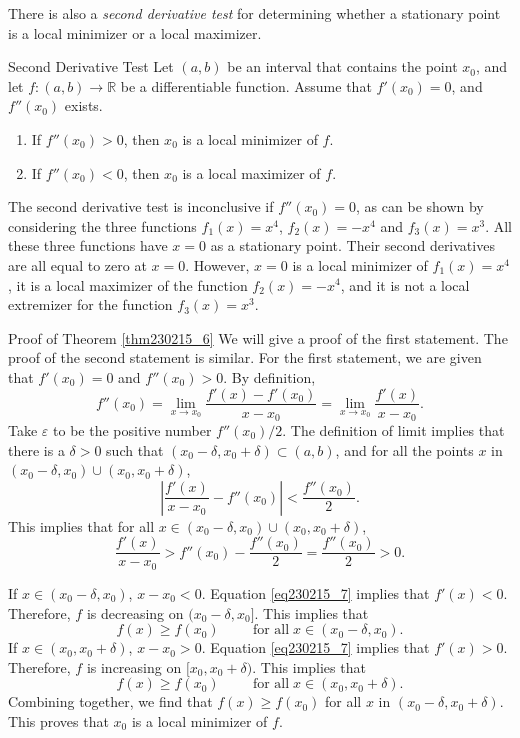 There is also a \emph{second derivative test} for determining whether a stationary point is a local minimizer or a local maximizer.

\begin{theorem}[label=thm230215_6]{Second Derivative Test}
Let $(a,b)$ be an interval that contains the point $x_0$, and let $f:(a, b)\to\mathbb{R}$ be a  differentiable function. Assume that $f'(x_0)=0$, and $f''(x_0)$ exists.
\begin{enumerate}[1.]
\item
If $f''(x_0)>0$, then $x_0$ is a local minimizer of $f$.
\item If $f''(x_0)<0$, then $x_0$ is a local maximizer of $f$.
\end{enumerate}
\end{theorem}

\begin{highlight}{}The second derivative test is inconclusive  if $f''(x_0)=0$, as can be shown by considering the three functions $f_1(x)=x^4$, $f_2(x)=-x^4$ and $f_3(x)=x^3$. All these three functions have $x=0$ as  a stationary point. Their second derivatives are all equal to zero at $x=0$. However, $x=0$ is a local minimizer of $f_1(x)=x^4$, it is a local maximizer of the function $f_2(x)=-x^4$, and it is not a local extremizer for the function $f_3(x)=x^3$.\end{highlight}

\begin{myproof}{\linkt Proof of Theorem \ref{thm230215_6}}
We will give a proof of the first statement. The proof of the second statement is similar.
For the first statement, we are given that $f'(x_0)=0$ and $f''(x_0)>0$. By definition, 
\[f''(x_0)=\lim_{x\to x_0}\frac{f'(x)-f'(x_0)}{x-x_0}=\lim_{x\to x_0}\frac{f'(x)}{x-x_0}.\]
Take $\varepsilon$ to be the positive number $f''(x_0)/2$. The definition of limit implies that there is a $\delta>0$ such that $(x_0-\delta, x_0+\delta)\subset (a, b)$, and for all the points $x$ in $(x_0-\delta, x_0)\cup (x_0, x_0+\delta)$, 
\[\left|\frac{f'(x)}{x-x_0}-f''(x_0)\right|<\frac{f''(x_0)}{2}.\]
This implies that for all $x\in (x_0-\delta, x_0)\cup (x_0, x_0+\delta)$,
\begin{equation}\label{eq230215_7}\frac{f'(x)}{x-x_0}>f''(x_0)-\frac{f''(x_0)}{2}=\frac{f''(x_0)}{2}>0.\end{equation}

If $x\in (x_0-\delta, x_0)$, $x-x_0<0$. Equation \eqref{eq230215_7} implies that $f'(x)<0$. Therefore, $f$ is   decreasing on $(x_0-\delta, x_0]$. This implies that
\[f(x)\geq f(x_0)\hspace{1cm} \text{for all}\;x\in (x_0-\delta, x_0).\]
If $x\in (x_0, x_0+\delta)$, $x-x_0>0$. Equation \eqref{eq230215_7} implies that $f'(x)>0$. Therefore, $f$ is   increasing on $[x_0, x_0+\delta)$. This implies that
\[f(x)\geq f(x_0)\hspace{1cm} \text{for all}\;x\in (x_0, x_0+\delta).\]
Combining together, we find that $f(x)\geq f(x_0)$ for all $x$ in $(x_0-\delta, x_0+\delta)$. This proves that $x_0$ is a local minimizer of $f$.


\end{myproof}
 
